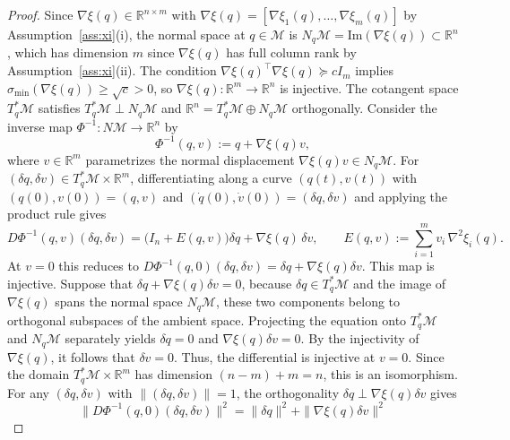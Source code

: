 \documentclass[12pt]{article}
\begin{document}
\begin{proof}
Since $\nabla\xi(q) \in \mathbb{R}^{n \times m}$ with $\nabla\xi(q) = [\nabla\xi_1(q), \ldots, \nabla\xi_m(q)]$ by
Assumption~\ref{ass:xi}(i), the normal space at $q \in \mathcal{M}$ is
$N_q\mathcal{M} = \mathrm{Im}(\nabla\xi(q)) \subset \mathbb{R}^n$, which has dimension $m$ since
$\nabla\xi(q)$ has full column rank by Assumption~\ref{ass:xi}(ii). The condition
$\nabla\xi(q)^\top \nabla\xi(q) \succeq c I_m$ implies $\sigma_{\min}(\nabla\xi(q)) \geq \sqrt{c} > 0$,
so $\nabla\xi(q) : \mathbb{R}^m \to \mathbb{R}^n$ is injective. The cotangent space
$T_q^*\mathcal{M}$ satisfies $T_q^*\mathcal{M} \perp N_q\mathcal{M}$
and $\mathbb{R}^n = T_q^*\mathcal{M} \oplus N_q\mathcal{M}$ orthogonally. Consider the inverse map
$\Phi^{-1} : N\mathcal{M} \to \mathbb{R}^n$ by
\begin{equation}\nonumber
    \Phi^{-1}(q,v) := q + \nabla\xi(q)v,
\end{equation}
where $v \in \mathbb{R}^m$ parametrizes the normal displacement $\nabla\xi(q)v \in N_q\mathcal{M}$. For
$(\delta q, \delta v) \in T_q^*\mathcal{M} \times \mathbb{R}^m$, differentiating along a curve
$(q(t), v(t))$ with $(q(0),v(0)) = (q,v)$ and $(\dot{q}(0), \dot{v}(0)) = (\delta q, \delta v)$
and applying the product rule gives
\begin{equation}\label{eq:dphi-1}
    D\Phi^{-1}(q,v)(\delta q, \delta v)
    = \bigl(I_n + E(q,v)\bigr)\delta q + \nabla\xi(q)\,\delta v,
    \qquad
    E(q,v) := \sum_{i=1}^m v_i\,\nabla^2\xi_i(q).
\end{equation}
At $v = 0$ this reduces to $D\Phi^{-1}(q,0)(\delta q, \delta v) = \delta q + \nabla\xi(q)\delta v$.
This map is injective. Suppose that $\delta q + \nabla\xi(q)\delta v = 0$, because $\delta q \in T_q^*\mathcal{M}$ and the image of $\nabla\xi(q)$ spans the normal space $N_q\mathcal{M}$, these two components belong to orthogonal subspaces of the ambient space. Projecting the equation onto $T_q^*\mathcal{M}$ and $N_q\mathcal{M}$ separately yields $\delta q = 0$ and $\nabla\xi(q)\delta v = 0$. By the injectivity of $\nabla\xi(q)$, it follows that $\delta v = 0$. Thus, the differential is injective at $v=0$. Since the
domain $T_q^*\mathcal{M} \times \mathbb{R}^m$ has dimension $(n-m) + m = n$, this is an isomorphism.
For any $(\delta q, \delta v)$ with $\|(\delta q,\delta v)\| = 1$, the orthogonality
$\delta q \perp \nabla\xi(q)\delta v$ gives
\begin{equation}\nonumber
    \|D\Phi^{-1}(q,0)(\delta q,\delta v)\|^2
    = \|\delta q\|^2 + \|\nabla\xi(q)\delta v\|^2

\end{equation}
\end{proof}
\end{document}
